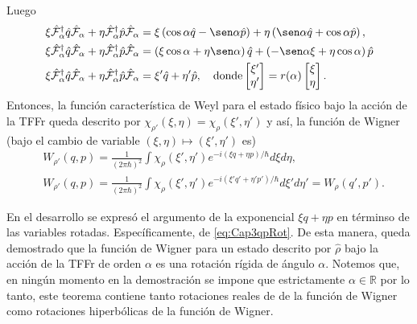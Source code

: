                 Luego
                \begin{align}\label{eq:Cap3qpRot}
                    & \xi \hat{\mathcal{F}}_\alpha^\dagger \hat{q} \hat{\mathcal{F}}_\alpha + \eta \hat{\mathcal{F}}_\alpha^\dagger \hat{p} \hat{\mathcal{F}}_\alpha = \xi \left(\cos\alpha \hat{q} - \sen\alpha \hat{p} \right) + \eta \left(\sen\alpha \hat{q} + \cos\alpha \hat{p} \right),\nonumber \\
                    & \xi \hat{\mathcal{F}}_\alpha^\dagger \hat{q} \hat{\mathcal{F}}_\alpha + \eta \hat{\mathcal{F}}_\alpha^\dagger \hat{p} \hat{\mathcal{F}}_\alpha = \left(\xi\cos\alpha + \eta\sen\alpha \right)\hat{q} + \left(-\sen\alpha \xi + \eta\cos\alpha \right)\hat{p}\nonumber \\
                    & \xi \hat{\mathcal{F}}_\alpha^\dagger \hat{q} \hat{\mathcal{F}}_\alpha + \eta \hat{\mathcal{F}}_\alpha^\dagger \hat{p} \hat{\mathcal{F}}_\alpha = \xi'\hat{q} + \eta' \hat{p}, \quad \text{donde}
                    \begin{bmatrix}
                        \xi'\\
                        \eta'
                    \end{bmatrix}
                    = r(\alpha)
                    \begin{bmatrix}
                        \xi\\
                        \eta
                    \end{bmatrix}.
                \end{align}
                Entonces, la función característica de Weyl para el estado físico bajo la acción de la TFFr queda descrito por $\chi_{\rho'}\left(\xi,\eta\right) = \chi_\rho \left(\xi',\eta'\right)$ y así, la función de Wigner (bajo el cambio de variable $\left(\xi,\eta\right) \mapsto \left(\xi',\eta'\right)$ es)
                \begin{align*}
                    & W_{\rho'}\left(q,p\right) = \frac{1}{\left(2\pi\hbar\right)^2} \int\chi_{\rho}\left(\xi',\eta'\right)e^{-i\left(\xi q + \eta p\right)/\hbar} d\xi d\eta,\\
                    & W_{\rho'}\left(q,p\right) = \frac{1}{\left(2\pi\hbar\right)^2} \int \chi_{\rho} \left(\xi', \eta'\right) e^{-i\left(\xi'q' + \eta'p' \right)/\hbar}d\xi'd\eta' = W_{\rho}\left(q',p'\right).
                \end{align*}

                En el desarrollo se expresó el argumento de la exponencial $\xi q + \eta p$ en términso de las variables rotadas. Específicamente, de \ref{eq:Cap3qpRot}. De esta manera, queda demostrado que la función de Wigner para un estado descrito por $\hat{\rho}$ bajo la acción de la TFFr de orden $\alpha$ es una rotación rígida de ángulo $\alpha$. Notemos que, en ningún momento en la demostración se impone que estrictamente $\alpha \in \mathbb{R}$ por lo tanto, este teorema contiene tanto rotaciones reales de de la función de Wigner como rotaciones hiperbólicas de la función de Wigner.

